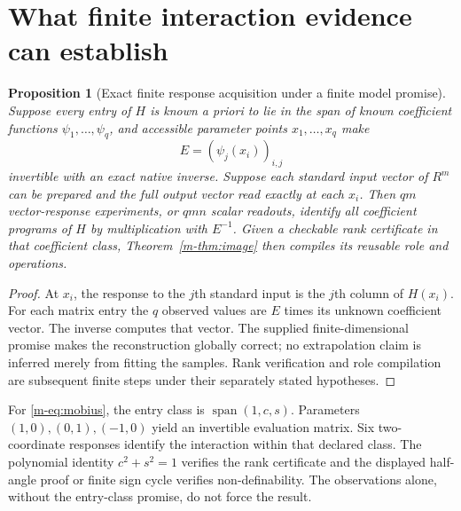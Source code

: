 \documentclass[11pt]{article}
\newtheorem{proposition}[theorem]{Proposition}
\theoremstyle{definition}
\theoremstyle{remark}
\begin{document}
\section{What finite interaction evidence can establish}\label{sec:identification}
\begin{proposition}[Exact finite response acquisition under a finite model promise]\label{m-prop:learn}
Suppose every entry of $H$ is known a priori to lie in the span of known coefficient functions $\psi_1,\ldots,\psi_q$, and accessible parameter points $x_1,\ldots,x_q$ make
\[
                  E=(\psi_j(x_i))_{i,j}
\]
invertible with an exact native inverse. Suppose each standard input vector of $R^m$ can be prepared and the full output vector read exactly at each $x_i$. Then $qm$ vector-response experiments, or $qmn$ scalar readouts, identify all coefficient programs of $H$ by multiplication with $E^{-1}$. Given a checkable rank certificate in that coefficient class, Theorem~\ref{m-thm:image} then compiles its reusable role and operations.
\end{proposition}
\begin{proof}
At $x_i$, the response to the $j$th standard input is the $j$th column of $H(x_i)$. For each matrix entry the $q$ observed values are $E$ times its unknown coefficient vector. The inverse computes that vector. The supplied finite-dimensional promise makes the reconstruction globally correct; no extrapolation claim is inferred merely from fitting the samples. Rank verification and role compilation are subsequent finite steps under their separately stated hypotheses.
\end{proof}

For \eqref{m-eq:mobius}, the entry class is $\operatorname{span}(1,c,s)$. Parameters $(1,0),(0,1),(-1,0)$ yield an invertible evaluation matrix. Six two-coordinate responses identify the interaction within that declared class. The polynomial identity $c^2+s^2=1$ verifies the rank certificate and the displayed half-angle proof or finite sign cycle verifies non-definability. The observations alone, without the entry-class promise, do not force the result.
\end{document}
